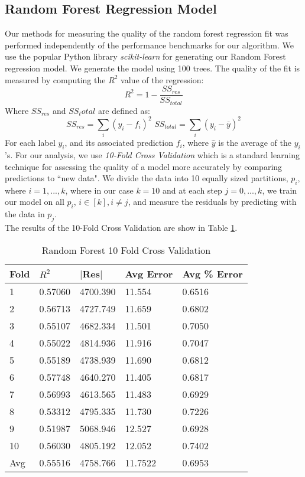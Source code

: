 \documentclass[10.5pt,journal]{IEEEtran}
\begin{document}
	\subsection{Random Forest Regression Model}
		Our methods for measuring the quality of the random forest regression fit was performed independently
		of the performance benchmarks for our algorithm. We use the popular Python library {\it{scikit-learn}}
		\cite{scikit}
		for generating our Random Forest regression model. We generate the model using 100 trees. The quality
		of the fit is measured by computing the $R^2$ value of the regression:
			\[R^2 = 1 - \frac{SS_{res}}{SS_{total}}\]
			Where $SS_{res}$ and $SS_total$ are defined as:
			\[SS_{res} = \sum_i (y_i-f_i)^2 \,\, SS_{total} = \sum_i (y_i-\bar{y})^2\]
		For each label $y_i$, and its associated prediction $f_i$, where $\hat{y}$ is the average of
		the $y_i$'s. For our analysis, we use {\it{10-Fold Cross Validation}} which is a standard
		learning technique for assessing the quality of a model more accurately by comparing predictions
		to ``new data". We divide the data into 10 equally sized partitions, $p_i$, where $i=1,...,k$, where
		in our case $k=10$ and at each step $j = 0,...,k$, we train our model on all $p_i$, $i\in [k],
		i\ne j$, and measure the residuals by predicting with the data in $p_j$. \\
		
		The results of the 10-Fold Cross Validation are show in Table \ref{fig:crossval_tbl}. \\
		
		\begin{table}[h!] \normalsize
			\caption{Random Forest 10 Fold Cross Validation}
			\centering
			\begin{tabular}{|l|l|l|l|l|} \hline
			Fold    & $R^2$ & $|$Res$|$ & Avg Error    & Avg \% Error \\ \hline 
			1       & 0.57060        & 4700.390  & 11.554 	& 0.6516      \\
			2       & 0.56713        & 4727.749  & 11.659 	& 0.6802        \\
			3       & 0.55107        & 4682.334  & 11.501  	& 0.7050       \\
			4       & 0.55022        & 4814.936  & 11.916 	& 0.7047        \\
			5       & 0.55189        & 4738.939  & 11.690 	& 0.6812        \\
			6       & 0.57748        & 4640.270 & 11.405 	& 0.6817        \\
			7       & 0.56993        & 4613.565  & 11.483 	& 0.6929        \\
			8       & 0.53312        & 4795.335  & 11.730 	& 0.7226        \\
			9       & 0.51987        & 5068.946  & 12.527  	& 0.6928       \\
			10      & 0.56030        & 4805.192  & 12.052  	& 0.7402        \\ \hline
			Avg		& 0.55516        & 4758.766 & 11.7522 	& 0.6953        \\ \hline
			\end{tabular}
			\label{fig:crossval_tbl}
		\end{table}
		
\end{document}
